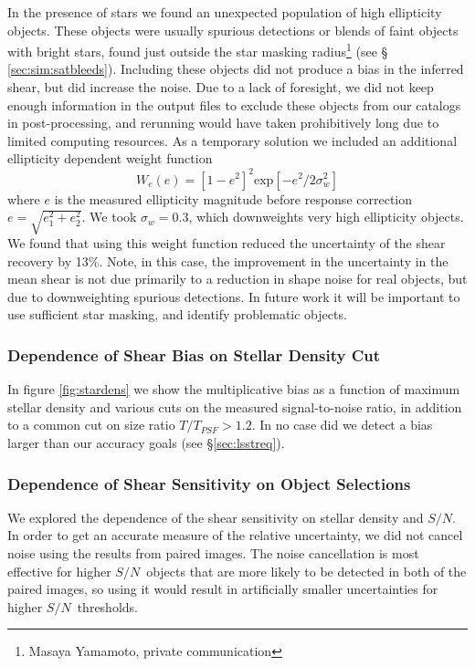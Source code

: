 \documentclass[twocolumn,twocolappendix,astrosym]{openjournal}
\newcommand{\snr}{$S/N$}
\begin{document}
In the presence of stars we found an unexpected population of high ellipticity
objects.  These objects were usually spurious detections or blends of faint
objects with bright stars, found just outside the star masking
radius\footnote{Masaya Yamamoto, private communication} (see \S
\ref{sec:sim:satbleeds}).  Including these objects did not produce a bias in
the inferred shear, but did increase the noise.  Due to a lack of foresight, we
did not keep enough information in the output files to exclude these objects
from our catalogs in post-processing, and rerunning would have taken
prohibitively long due to limited computing resources.  As a temporary solution
we included an additional ellipticity dependent weight function \citep{ba14}
\begin{equation}
    W_e(e) = \left[1 - e^2\right]^2 \mathrm{exp}\left[ -e^2/2 \sigma_w^2\right]
\end{equation}
where $e$ is the measured ellipticity magnitude before response
correction $e = \sqrt{e_1^2 + e_2^2}$.  We took
$\sigma_w = 0.3$, which downweights very high ellipticity objects.  We found
that using this weight function reduced the uncertainty of the shear recovery
by 13\%.  Note, in this case, the improvement in the uncertainty in the mean
shear is not due primarily to a reduction in shape noise for real objects, but
due to downweighting spurious detections.  In future work it will be important
to use sufficient star masking, and identify problematic objects.

\subsubsection{Dependence of Shear Bias on Stellar Density Cut} \label{sec:results:sdens}

In figure \ref{fig:stardens} we show the multiplicative bias as a function of
maximum stellar density and various cuts on the measured signal-to-noise ratio,
in addition to a common cut on size ratio $T/T_{PSF} > 1.2$.  In no case did we
detect a bias larger than our accuracy goals (see \S \ref{sec:lsstreq}).




\subsubsection{Dependence of Shear Sensitivity on Object Selections}
\label{sec:results:sdensnoise}

We explored the dependence of the shear sensitivity on stellar density and
\snr.  In order to get an accurate measure of the relative uncertainty, we did
not cancel noise using the results from paired images.  The noise cancellation
is most effective for higher \snr\ objects that are more likely to be detected
in both of the paired images, so using it would result in artificially smaller
uncertainties for higher \snr\ thresholds.
\end{document}
